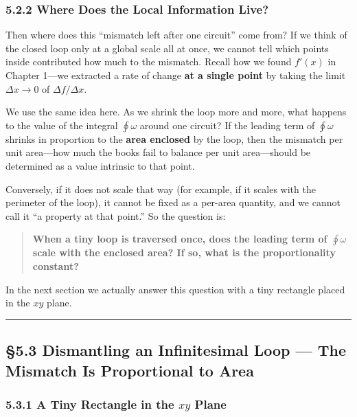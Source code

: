 \hypertarget{where-does-the-local-information-live}{%
\subsubsection{5.2.2 Where Does the Local Information
Live?}\label{where-does-the-local-information-live}}

Then where does this ``mismatch left after one circuit'' come from? If
we think of the closed loop only at a global scale all at once, we
cannot tell which points inside contributed how much to the mismatch.
Recall how we found \(f'(x)\) in Chapter 1---we extracted a rate of
change \textbf{at a single point} by taking the limit \(\Delta x \to 0\)
of \(\Delta f / \Delta x\).

We use the same idea here. As we shrink the loop more and more, what
happens to the value of the integral \(\oint \omega\) around one
circuit? If the leading term of \(\oint \omega\) shrinks in proportion
to the \textbf{area enclosed} by the loop, then the mismatch per unit
area---how much the books fail to balance per unit area---should be
determined as a value intrinsic to that point.

Conversely, if it does not scale that way (for example, if it scales
with the perimeter of the loop), it cannot be fixed as a per-area
quantity, and we cannot call it ``a property at that point.'' So the
question is:

\begin{quote}
\textbf{When a tiny loop is traversed once, does the leading term of $\oint \omega$ scale with the enclosed area? If so, what is the proportionality constant?}
\end{quote}

In the next section we actually answer this question with a tiny
rectangle placed in the \(xy\) plane.

\begin{center}\rule{0.5\linewidth}{0.5pt}\end{center}

\hypertarget{dismantling-an-infinitesimal-loop-the-mismatch-is-proportional-to-area}{%
\subsection{§5.3 Dismantling an Infinitesimal Loop --- The Mismatch Is
Proportional to
Area}\label{dismantling-an-infinitesimal-loop-the-mismatch-is-proportional-to-area}}

\hypertarget{a-tiny-rectangle-in-the-xy-plane}{%
\subsubsection{\texorpdfstring{5.3.1 A Tiny Rectangle in the \(xy\)
Plane}{5.3.1 A Tiny Rectangle in the xy Plane}}\label{a-tiny-rectangle-in-the-xy-plane}}

